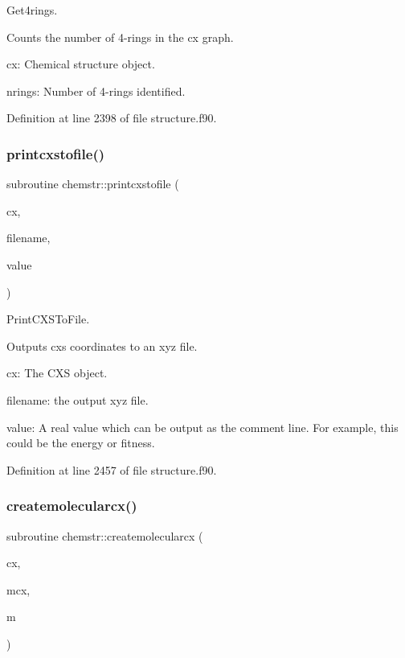 Get4rings. 

Counts the number of 4-\/rings in the cx graph.


\begin{DoxyItemize}
\item cx\+: Chemical structure object.
\item nrings\+: Number of 4-\/rings identified. 
\end{DoxyItemize}

Definition at line 2398 of file structure.\+f90.

\mbox{\label{namespacechemstr_ab5a731a94c47cefa1b1b0683a19819fa}} 
\subsubsection{\texorpdfstring{printcxstofile()}{printcxstofile()}}
{\footnotesize\ttfamily subroutine chemstr\+::printcxstofile (\begin{DoxyParamCaption}\item[{type(\mbox{\hyperlink{structchemstr_1_1cxs}{cxs}})}]{cx,  }\item[{character, dimension($\ast$)}]{filename,  }\item[{real$\ast$8}]{value }\end{DoxyParamCaption})}



Print\+C\+X\+S\+To\+File. 

Outputs cxs coordinates to an xyz file.


\begin{DoxyItemize}
\item cx\+: The C\+XS object.
\item filename\+: the output xyz file.
\item value\+: A real value which can be output as the comment line. For example, this could be the energy or fitness. 
\end{DoxyItemize}

Definition at line 2457 of file structure.\+f90.

\mbox{\label{namespacechemstr_a3e7d49062cb6814286622fa8f5485ecf}} 
\subsubsection{\texorpdfstring{createmolecularcx()}{createmolecularcx()}}
{\footnotesize\ttfamily subroutine chemstr\+::createmolecularcx (\begin{DoxyParamCaption}\item[{type(\mbox{\hyperlink{structchemstr_1_1cxs}{cxs}})}]{cx,  }\item[{type(\mbox{\hyperlink{structchemstr_1_1cxs}{cxs}})}]{mcx,  }\item[{integer}]{m }\end{DoxyParamCaption})}



